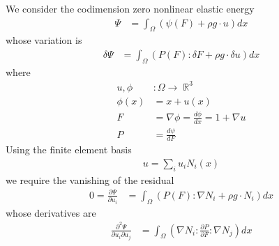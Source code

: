 \documentclass[11pt]{article}
\DeclareMathOperator{\R}{\mathbb{R}}
\begin{document}
We consider the codimension zero nonlinear elastic energy
\begin{align*}
\Psi &= \int_\Omega \left( \psi(F) + \rho g \cdot u \right) dx
\end{align*}
whose variation is
\begin{align*}
\delta \Psi &= \int_\Omega \left( P(F) : \delta F + \rho g \cdot \delta u \right) dx
\end{align*}
where
\begin{align*}
u,\phi &: \Omega \to \R^3 \\
\phi(x) &= x + u(x) \\
F &= \nabla \phi = \frac{d \phi}{d x} = 1 + \nabla u \\
P &= \frac{d\psi}{dF}
\end{align*}
Using the finite element basis
\begin{align*}
u = \sum_i u_i N_i(x)
\end{align*}
we require the vanishing of the residual
\begin{align*}
0 = \frac{\partial \Psi}{\partial u_i}
  &= \int_\Omega \left( P(F) : \nabla N_i + \rho g \cdot N_i \right) dx
\end{align*}
whose derivatives are
\begin{align*}
\frac{\partial^2 \Psi}{\partial u_i \partial u_j}
  &= \int_\Omega \left( \nabla N_i : \frac{\partial P}{\partial F} : \nabla N_j \right) dx
\end{align*}
\end{document}
